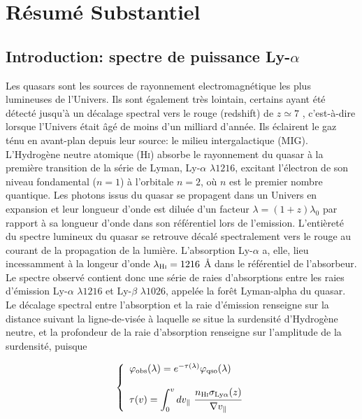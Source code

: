 \chapter{Résumé Substantiel}
\label{apx:res_fr}
{\color{purple}\titlerule[2.5pt]}
\vspace{4pc}%

\section{Introduction: spectre de puissance Ly-$\alpha$}

Les quasars sont les sources de rayonnement electromagnétique les plus lumineuses de l'Univers. Ils sont également très lointain, certains ayant été détecté jusqu'à un décalage spectral vers le rouge (redshift) de $z \simeq 7$ \citep{Mortlock2011}, c'est-à-dire lorsque l'Univers était âgé de moins d'un milliard d'année. Ils éclairent le gaz ténu en avant-plan depuis leur source: le milieu intergalactique (MIG). L'Hydrogène neutre atomique (\textsc{Hi}) absorbe le rayonnement du quasar à la première transition de la série de Lyman, Ly-$\alpha$ $\lambda 1216$, excitant l'électron de son niveau fondamental ($n=1$) à l'orbitale $n=2$, où $n$ est le premier nombre quantique. Les photons issus du quasar se propagent dans un Univers en expansion et leur longueur d'onde est diluée d'un facteur $\lambda = (1+z) \lambda_0$ par rapport à sa longueur d'onde dans son référentiel lors de l'emission. L'entièreté du spectre lumineux du quasar se retrouve décalé spectralement vers le rouge au courant de la propagation de la lumière. L'absorption Ly-$\alpha$ a, elle, lieu incessamment à la longeur d'onde $\lambda_{\textsc{Hi}} = 1216$ {\AA} dans le référentiel de l'absorbeur. Le spectre observé contient donc une série de raies d'absorptions entre les raies d'émission Ly-$\alpha$ $\lambda 1216$ et Ly-$\beta$ $\lambda 1026$, appelée la forêt Lyman-alpha du quasar. Le décalage spectral entre l'absorption et la raie d'émission renseigne sur la distance suivant la ligne-de-visée à laquelle se situe la surdensité d'Hydrogène neutre, et la profondeur de la raie d'absorption renseigne sur l'amplitude de la surdensité, puisque

\begin{equation}
\left\{
\begin{array}{l}
\varphi_\mathrm{obs} (\lambda) = e^{-\tau (\lambda)} \varphi_\mathrm{qso} (\lambda) \\
\\
\tau (v) = \displaystyle \int_{0}^{v} dv_\parallel~\cfrac{n_\textsc{Hi} \sigma_{\mathrm{Ly}\alpha} (z)}{\nabla v_\parallel}
\end{array}
\right.
\end{equation}


